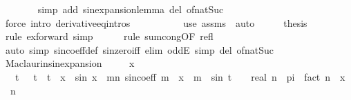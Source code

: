\begin{isabellebody}
\ \ \ \ \ \ \isamarkupfalse%
\ {\isacharparenleft}{\kern0pt}simp\ add{\isacharcolon}{\kern0pt}\ sin{\isacharunderscore}{\kern0pt}expansion{\isacharunderscore}{\kern0pt}lemma\ del{\isacharcolon}{\kern0pt}\ of{\isacharunderscore}{\kern0pt}nat{\isacharunderscore}{\kern0pt}Suc{\isacharparenright}{\kern0pt}\isanewline
\ \ \ \ \ \ \isamarkupfalse%
\ {\isacharparenleft}{\kern0pt}force\ intro{\isacharbang}{\kern0pt}{\isacharcolon}{\kern0pt}\ derivative{\isacharunderscore}{\kern0pt}eq{\isacharunderscore}{\kern0pt}intros{\isacharparenright}{\kern0pt}\isanewline
\ \ \ \ \ \ \isamarkupfalse%
\isanewline
\ \ \isamarkupfalse%
\ {\isacharparenleft}{\kern0pt}use\ assms\ \ auto{\isacharparenright}{\kern0pt}\isanewline
\ \ \isamarkupfalse%
\ \isamarkupfalse%
\ {\isacharquery}{\kern0pt}thesis\isanewline
\ \ \ \ \isamarkupfalse%
\ {\isacharparenleft}{\kern0pt}rule\ ex{\isacharunderscore}{\kern0pt}forward{\isacharcomma}{\kern0pt}\ simp{\isacharparenright}{\kern0pt}\isanewline
\ \ \ \ \isamarkupfalse%
\ {\isacharparenleft}{\kern0pt}rule\ sum{\isachardot}{\kern0pt}cong{\isacharbrackleft}{\kern0pt}OF\ refl{\isacharbrackright}{\kern0pt}{\isacharparenright}{\kern0pt}\isanewline
\ \ \ \ \isamarkupfalse%
\ {\isacharparenleft}{\kern0pt}auto\ simp{\isacharcolon}{\kern0pt}\ sin{\isacharunderscore}{\kern0pt}coeff{\isacharunderscore}{\kern0pt}def\ sin{\isacharunderscore}{\kern0pt}zero{\isacharunderscore}{\kern0pt}iff\ elim{\isacharcolon}{\kern0pt}\ oddE\ simp\ del{\isacharcolon}{\kern0pt}\ of{\isacharunderscore}{\kern0pt}nat{\isacharunderscore}{\kern0pt}Suc{\isacharparenright}{\kern0pt}\isanewline
\ \ \ \ \isamarkupfalse%
\isanewline
{}\isamarkupfalse%
%
\endisatagproof
{\isafoldproof}%
%
\isadelimproof
\isanewline
%
\endisadelimproof
\isanewline
{}\isamarkupfalse%
\ Maclaurin{\isacharunderscore}{\kern0pt}sin{\isacharunderscore}{\kern0pt}expansion{}{\isacharcolon}{\kern0pt}\isanewline
\ \ \ {\isachardoublequoteopen}{}\ {\isacharless}{\kern0pt}\ x{\isachardoublequoteclose}\isanewline
\ \ \ {\isachardoublequoteopen}{\isasymexists}t{\isachardot}{\kern0pt}\ {}\ {\isacharless}{\kern0pt}\ t\ {\isasymand}\ t\ {\isasymle}\ x\ {\isasymand}\ sin\ x\ {\isacharequal}{\kern0pt}\ {\isacharparenleft}{\kern0pt}{\isasymSum}m{\isacharless}{\kern0pt}n{\isachardot}{\kern0pt}\ sin{\isacharunderscore}{\kern0pt}coeff\ m\ {\isacharasterisk}{\kern0pt}\ x\ {\isacharcircum}{\kern0pt}\ m{\isacharparenright}{\kern0pt}\ {\isacharplus}{\kern0pt}\ {\isacharparenleft}{\kern0pt}sin\ {\isacharparenleft}{\kern0pt}t\ {\isacharplus}{\kern0pt}\ {}{\isacharslash}{\kern0pt}{}\ {\isacharasterisk}{\kern0pt}\ real\ n\ {\isacharasterisk}{\kern0pt}\ pi{\isacharparenright}{\kern0pt}\ {\isacharslash}{\kern0pt}\ fact\ n{\isacharparenright}{\kern0pt}\ {\isacharasterisk}{\kern0pt}\ x\ {\isacharcircum}{\kern0pt}\ n{\isachardoublequoteclose}\isanewline

\end{isabellebody}
